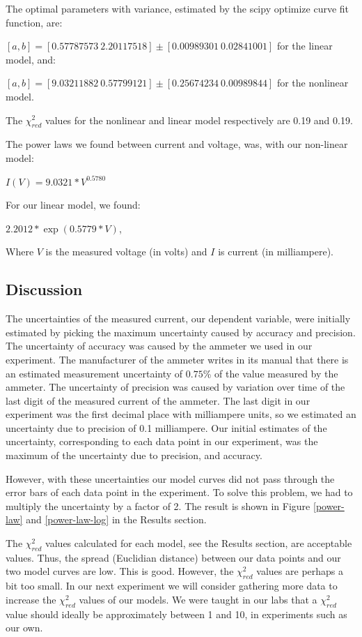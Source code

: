 \documentclass[letterpaper,12pt]{article}
\begin{document}
The optimal parameters with variance, estimated by the scipy optimize curve fit function, are: 

$[a,b] = [0.57787573\ 2.20117518] \pm [0.00989301\ 0.02841001]$  for the linear model, and: 

$[a,b] = [9.03211882\ 0.57799121] \pm [0.25674234\ 0.00989844]$ for the nonlinear model.

The $\chi^2_{red}$ values for the nonlinear and linear model respectively are 0.19 and 0.19.

The power laws we found between current and voltage, was, with our non-linear model: 

$I(V)= 9.0321 * V ^ {0.5780} $

For our linear model, we found:  

$2.2012 * \exp( 0.5779 * V )$,

Where $V$ is the measured voltage (in volts) and $I$ is current (in milliampere).

\subsection{Discussion}

The uncertainties of the measured current, our dependent variable, 
were initially estimated by picking the maximum uncertainty caused by accuracy and precision. 
The uncertainty of accuracy was caused by the ammeter we used in our experiment. 
The manufacturer of the ammeter writes in its manual that there is an 
estimated measurement uncertainty of $0.75$\% of the value measured by the ammeter. 
The uncertainty of precision was caused by variation over time of the last digit of 
the measured current of the ammeter. The last digit in our experiment was the first 
decimal place with milliampere units, so we estimated an uncertainty due to precision 
of 0.1 milliampere. Our initial estimates of the uncertainty, corresponding to each
 data point in our experiment, was the maximum of the uncertainty due to precision, and accuracy.

However, with these uncertainties our model curves did not pass through 
the error bars of each data point in the experiment. To solve this problem, 
we had to multiply the uncertainty by a factor of 2. The result is shown in 
Figure \ref{power-law} and \ref{power-law-log} in the Results section.

The $\chi^2_{red}$ values calculated for each model, see the Results section, are acceptable values. Thus, the spread (Euclidian distance) between our data points and our two model curves are low. This is good. However, the $\chi^2_{red}$ values are perhaps a bit too small. In our next experiment we will consider gathering more data to increase the $\chi^2_{red}$ values of our models. We were taught in our labs that a $\chi^2_{red}$ value should ideally be approximately between 1 and 10, in experiments such as our own.
\end{document}
